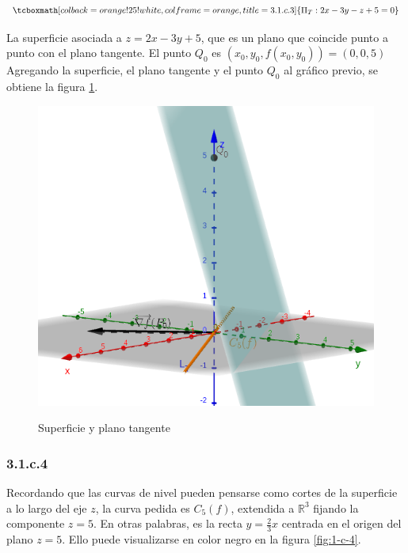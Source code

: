\documentclass{article}
\renewcommand{\Bbb}{\mathbb}
\begin{document}
\begin{equation}
\tcboxmath[colback=orange!25!white,colframe=orange,title=3.1.c.3]
{
\Pi_T: 2x -3y -z +5 = 0
}
\end{equation}

La superficie asociada a $z = 2x -3y +5$, que es un plano que coincide punto a punto con el plano tangente. El punto $Q_0$ es $(x_0, y_0, f(x_0,y_0)) = (0,0,5)$ Agregando la superficie, el plano tangente y el punto $Q_0$ al gráfico previo, se obtiene la figura \ref{fig:1-c-3}.

\begin{figure}[ht]
\caption{Superficie y plano tangente}
\includegraphics[scale=0.35]{img/ejercicios/3/1-c-3.png} 
\centering
\label{fig:1-c-3}
\end{figure}

\subsubsection*{3.1.c.4}
\label{subsubsec:3.1.c.4}

Recordando que las curvas de nivel pueden pensarse como cortes de la superficie a lo largo del eje $z$, la curva pedida es $C_{5}(f)$, extendida a $\Bbb R^3$ fijando la componente $z = 5$. En otras palabras, es la recta $y = \frac{2}{3}x$ centrada en el origen del plano $z = 5$. Ello puede visualizarse en color negro en la figura \ref{fig:1-c-4}.
\end{document}
